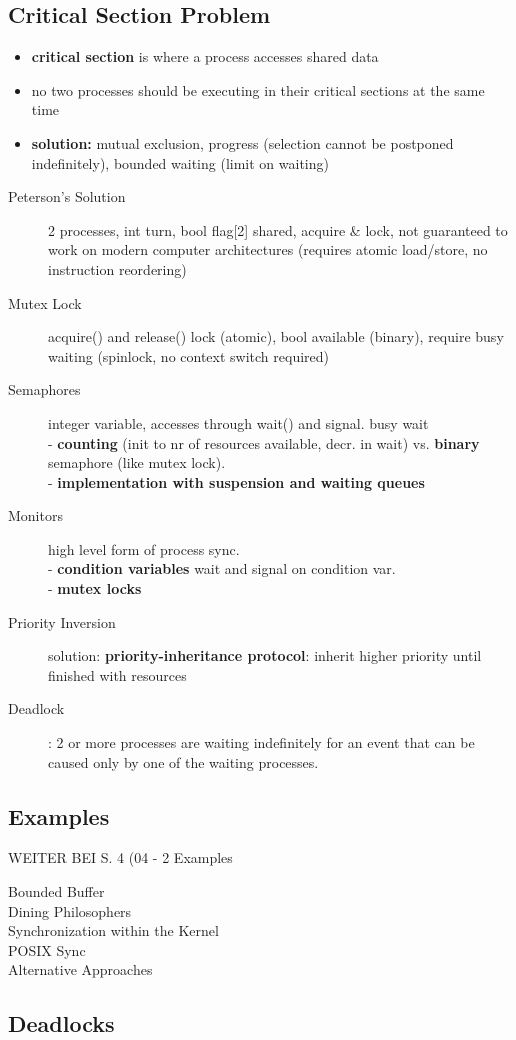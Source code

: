\subsection*{Critical Section Problem}
\begin{itemize}
    \item \textbf{critical section} is where a process accesses shared data
    \item no two processes should be executing in their critical sections at the same time
    \item \textbf{solution:} mutual exclusion, progress (selection cannot be postponed indefinitely), bounded waiting (limit on waiting)
\end{itemize}
\begin{description}
    \item[Peterson's Solution] 2 processes, int turn, bool flag[2] shared, acquire \& lock, not guaranteed to work on modern computer architectures (requires atomic load/store, no instruction reordering)
    \item[Mutex Lock] acquire() and release() lock (atomic), bool available (binary), require busy waiting (spinlock, no context switch required)
    \item[Semaphores] integer variable, accesses through wait() and signal. busy wait \\
        - \textbf{counting} (init to nr of resources available, decr. in wait) vs. \textbf{binary} semaphore (like mutex lock). \\
        -  \textbf{implementation with suspension and waiting queues} %
    \item[Monitors] high level form of process sync. \\
        - \textbf{condition variables} wait and signal on condition var.   \\
        - \textbf{mutex locks}
    \item[Priority Inversion] solution: \textbf{priority-inheritance protocol}: inherit higher priority until finished with resources %
    \item[Deadlock]: 2 or more processes are waiting indefinitely for an event that can be caused only by one of the waiting processes.
\end{description}
\subsection*{Examples}
WEITER BEI S. 4 (04 - 2 Examples
\begin{description}
    \item[Bounded Buffer]
    \item[Dining Philosophers]
    \item[Synchronization within the Kernel]
    \item[POSIX Sync]
    \item[Alternative Approaches]
\end{description}
\subsection*{Deadlocks}
